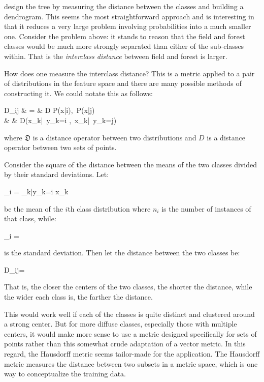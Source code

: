 \citet{Benabdeslem_Bennani2006} design the tree by measuring the distance between
the classes and building a dendrogram.
This seems the most straightforward approach and is interesting in that it reduces a very large problem involving probabilities into a much smaller one.
Consider the problem above: it stands to reason that the field and forest classes would be much more strongly separated than either of the sub-classes within.
That is the {\it interclass distance} between field and forest is larger.

How does one measure the interclass distance? 
This is a metric applied to a pair of distributions in the feature space
and there are many possible methods of constructing it.
We could notate this as follows:
\begin{eqnarraynon}
	D_{ij} & = & \mathfrak D \left \lbrace P(\vec x|i),~P(\vec x|j) \right \rbrace \\
	       & \approx & D\left (\lbrace \vec x_k|~y_k=i \rbrace,~\lbrace \vec x_k|~y_k=j\rbrace \right )
\end{eqnarraynon}
where $\mathfrak D$ is a distance operator between two distributions and $D$ is a distance operator between two sets of points.

Consider the square of the distance between the means of the two classes divided by their standard deviations. Let:
\begin{eqnnon}
	\vec \mu_i =  \sum_{k|y_k=i} \vec x_k
\end{eqnnon}
be the mean of the $i$th class distribution where $n_i$ is the number of instances of that class, while:
\begin{eqnnon}
	\sigma_i = 
\end{eqnnon}
is the standard deviation.
Then let the distance between the two classes be:
\begin{eqnnon}
	D_{ij}=
\end{eqnnon}
That is, the closer the centers of the two classes, the shorter the distance, while the wider each class is, the farther the distance.
	
This would work well if each of the classes is quite distinct and clustered around a strong center.
But for more diffuse classes, especially those with multiple centers, it would make more sense to use a metric designed specifically for sets of points rather than this somewhat crude adaptation of a vector metric.
In this regard, the Hausdorff metric seems tailor-made for the application.
The Hausdorff metric measures the distance between two subsets in a metric space, which is one way to conceptualize the training data.

